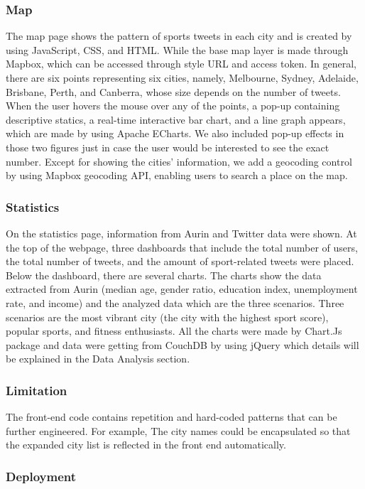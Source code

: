 \subsubsection{Map}
The map page shows the pattern of sports tweets in each city and is created by using JavaScript, CSS, and HTML. While the base map layer is made through Mapbox, which can be accessed through style URL and access token. In general, there are six points representing six cities, namely, Melbourne, Sydney, Adelaide, Brisbane, Perth, and Canberra, whose size depends on the number of tweets. When the user hovers the mouse over any of the points, a pop-up containing descriptive statics, a real-time interactive bar chart, and a line graph appears, which are made by using Apache ECharts. We also included pop-up effects in those two figures just in case the user would be interested to see the exact number. Except for showing the cities’ information, we add a geocoding control by using Mapbox geocoding API, enabling users to search a place on the map.

\subsubsection{Statistics}
On the statistics page, information from Aurin and Twitter data were shown. At the top of the webpage, three dashboards that include the total number of users, the total number of tweets, and the amount of sport-related tweets were placed. Below the dashboard, there are several charts. The charts show the data extracted from Aurin (median age, gender ratio, education index, unemployment rate, and income) and the analyzed data which are the three scenarios. Three scenarios are the most vibrant city (the city with the highest sport score), popular sports, and fitness enthusiasts. All the charts were made by Chart.Js package and data were getting from CouchDB by using jQuery which details will be explained in the Data Analysis section.

\subsubsection{Limitation}
The front-end code contains repetition and hard-coded patterns that can be further engineered. For example, The city names could be encapsulated so that the expanded city list is reflected in the front end automatically. 

\subsubsection{Deployment}

